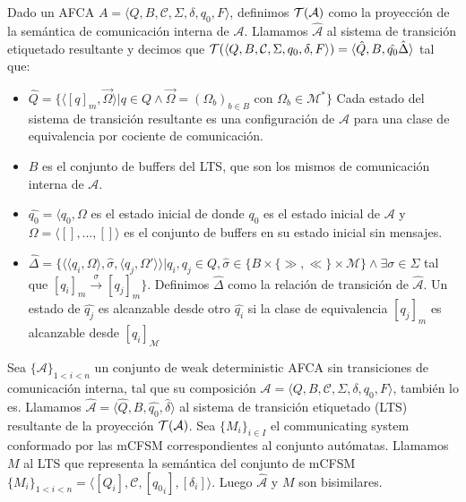 \begin{definition}\label{def:pci}
Dado un AFCA $A = \langle Q, B, \mathcal{C}, \Sigma, \delta, q_0, F \rangle$, definimos $\mathcal{T}(\mathcal{A})$ como la proyección de la semántica de comunicación interna de $\mathcal{A}$. Llamamos $\hat{\mathcal{A}}$ al sistema de transición etiquetado resultante y decimos que $\mathcal{T} (\langle Q, B, \mathcal{C}, \Sigma, q_0, \delta, F \rangle)= \langle \hat{Q}, B, \hat{q_0} \hat{\Delta} \rangle$ tal que:
\begin{itemize}
    \item $ \hat{Q} = \{ \langle [q]_m, \overrightarrow{\Omega} \rangle | q \in Q \land \overrightarrow{\Omega} = (\Omega_b)_{b \in B}$ con $\Omega_b \in \mathcal{M}^* \}$ Cada estado del sistema de transición resultante es una configuración de $\mathcal{A}$ para una clase de equivalencia por cociente de comunicación.
    
    \item $B$ es el conjunto de buffers del LTS, que son los mismos de comunicación interna de $\mathcal{A}$.
    
    \item $\hat{q_0}= \langle q_0, \Omega$ es el estado inicial de  donde $q_0$ es el estado inicial de $\mathcal{A}$ y $\Omega = \langle [], \ldots, [] \rangle$ es el conjunto de buffers en su estado inicial sin mensajes.
    
    \item $\hat{\Delta}= \{\langle \langle q_i, \Omega \rangle, \hat{\sigma},\langle q_j, \Omega' \rangle \rangle | q_i,q_j \in Q, \hat{\sigma} \in \{B \times \{\gg, \ll\} \times \mathcal{M}\} \land \exists \sigma \in \Sigma$ tal que  $[q_i]_m \xrightarrow{\sigma} [q_j]_m \}$. Definimos $\hat{\Delta}$ como la relación de transición de $\hat{\mathcal{A}}$. Un estado de $\hat{q_j}$ es alcanzable desde otro $\hat{q_i}$ si la clase de equivalencia $[q_j]_m$ es alcanzable desde $[q_i]_\mathcal{M}$
    
\end{itemize}
\end{definition}

\begin{theorem} Sea $\{\mathcal{A}\}_{1 < i < n}$ un conjunto de weak deterministic AFCA sin transiciones de comunicación interna, tal que su composición $\mathcal{A} = \langle Q, B, \mathcal{C},\Sigma, \delta, q_0, F \rangle$, también lo es. Llamamos $\hat{\mathcal{A}}=\langle \hat{Q}, B, \hat{q_0}, \hat{\delta} \rangle$ al sistema de transición etiquetado (LTS) resultante de la proyección $\mathcal{T}(\mathcal{A})$. Sea $\{M_i\}_{i \in I}$ el communicating system conformado por las mCFSM correspondientes al conjunto autómatas. Llamamos $M$ al LTS que representa la semántica del conjunto de mCFSM $\{M_i\}_{1< i < n}= \langle [Q_i], \mathcal{C}, [{q_0}_i], [\delta_i] \rangle$. Luego $\hat{\mathcal{A}}$ y $M$ son bisimilares. 
\end{theorem}

